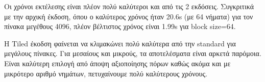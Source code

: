 \documentclass[../final_report.tex]{subfiles}
\begin{document}
Οι χρόνοι εκτέλεσης είναι πλέον πολύ καλύτεροι και από τις 2 εκδόσεις. Συγκριτικά με την αρχική έκδοση,
όπου ο καλύτερος χρόνος ήταν 20.6s (με 64 νήματα) για τον πίνακα μεγέθους 4096, πλέον βέλτιστος χρόνος
είναι 1.99s για block size=64. 

Η Tiled έκοδση φαίνεται να κλιμακώνει πολύ καλύτερα από την standard για μεγάλους πίνακες. Για μεσαίους
και μικρούς, τα αποτελέσματα είναι αρκετά παρόμοια. Είναι καλύτερη επιλογή από άποψη αξιοποίησης πόρων
καθώς ακόμα και με μικρότερο αριθμό νημάτων, πετυχαίνουμε πολύ καλύτερους χρόνους.
\end{document}
